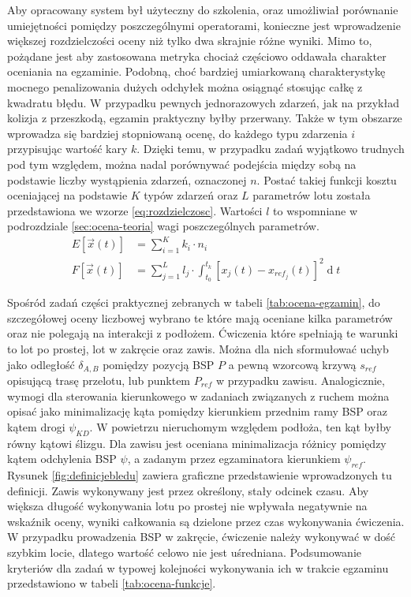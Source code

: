 Aby opracowany system był użyteczny do szkolenia, oraz umożliwiał porównanie umiejętności pomiędzy poszczególnymi operatorami, konieczne jest wprowadzenie większej rozdzielczości oceny niż tylko dwa skrajnie różne wyniki. Mimo to, pożądane jest aby zastosowana metryka chociaż częściowo oddawała charakter oceniania na egzaminie. Podobną, choć bardziej umiarkowaną charakterystykę mocnego penalizowania dużych odchyłek można osiągnąć stosując całkę z kwadratu błędu. W przypadku pewnych jednorazowych zdarzeń, jak na przykład kolizja z przeszkodą, egzamin praktyczny byłby przerwany. Także w tym obszarze wprowadza się bardziej stopniowaną ocenę, do każdego typu zdarzenia $ i $ przypisując wartość kary $ k $. Dzięki temu, w przypadku zadań wyjątkowo trudnych pod tym względem, można nadal porównywać podejścia między sobą na podstawie liczby wystąpienia zdarzeń, oznaczonej $ n $. Postać takiej funkcji kosztu oceniającej na podstawie $ K $ typów zdarzeń oraz $ L $ parametrów lotu została przedstawiona we wzorze \ref{eq:rozdzielczosc}. Wartości $ l $ to wspomniane w podrozdziale \ref{sec:ocena-teoria} wagi poszczególnych parametrów.
\begin{align}
    \label{eq:rozdzielczosc}
    E[ \vec{x}(t) ] &= \sum_{i=1}^{K} k_i \cdot n_i
    \\
    F[ \vec{x}(t) ] &= \sum_{j=1}^{L} l_j \cdot \int_{t_0}^{t_k} [ x_j(t) - x_{ref_j}(t) ]^2 \operatorname{d}t
\end{align}

Spośród zadań części praktycznej zebranych w tabeli \ref{tab:ocena-egzamin}, do szczegółowej oceny liczbowej wybrano te które mają oceniane kilka parametrów oraz nie polegają na interakcji z podłożem. Ćwiczenia które spełniają te warunki to lot po prostej, lot w zakręcie oraz zawis. Można dla nich sformułować uchyb jako odległość $ \delta_{A,B} $ pomiędzy pozycją BSP $ P $ a pewną wzorcową krzywą $ s_{ref} $ opisującą trasę przelotu, lub punktem $ P_{ref} $ w przypadku zawisu. Analogicznie, wymogi dla sterowania kierunkowego w zadaniach związanych z ruchem można opisać jako minimalizację kąta pomiędzy kierunkiem przednim ramy BSP oraz kątem drogi $ \psi_{KD} $. W powietrzu nieruchomym względem podłoża, ten kąt byłby równy kątowi ślizgu. Dla zawisu jest oceniana minimalizacja różnicy pomiędzy kątem odchylenia BSP $ \psi $, a zadanym przez egzaminatora kierunkiem $ \psi_{ref} $. Rysunek \ref{fig:definicjebledu} zawiera graficzne przedstawienie wprowadzonych tu definicji. Zawis wykonywany jest przez określony, stały odcinek czasu. Aby większa długość wykonywania lotu po prostej nie wpływała negatywnie na wskaźnik oceny, wyniki całkowania są dzielone przez czas wykonywania ćwiczenia. W przypadku prowadzenia BSP w zakręcie, ćwiczenie należy wykonywać w dość szybkim locie, dlatego wartość celowo nie jest uśredniana. Podsumowanie kryteriów dla zadań w typowej kolejności wykonywania ich w trakcie egzaminu przedstawiono w tabeli \ref{tab:ocena-funkcje}.

